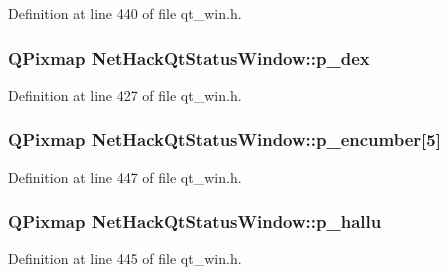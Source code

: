 Definition at line 440 of file qt\+\_\+win.\+h.

\hypertarget{classNetHackQtStatusWindow_a4dbea91b6a1442706721f60296f5d2e2}{
\subsubsection[{p\+\_\+dex}]{\setlength{\rightskip}{0pt plus 5cm}Q\+Pixmap Net\+Hack\+Qt\+Status\+Window\+::p\+\_\+dex\hspace{0.3cm}{\ttfamily [private]}}}\label{classNetHackQtStatusWindow_a4dbea91b6a1442706721f60296f5d2e2}


Definition at line 427 of file qt\+\_\+win.\+h.

\hypertarget{classNetHackQtStatusWindow_a36efb7785759ef09d4b2ecd523148ac3}{
\subsubsection[{p\+\_\+encumber}]{\setlength{\rightskip}{0pt plus 5cm}Q\+Pixmap Net\+Hack\+Qt\+Status\+Window\+::p\+\_\+encumber\mbox{[}5\mbox{]}\hspace{0.3cm}{\ttfamily [private]}}}\label{classNetHackQtStatusWindow_a36efb7785759ef09d4b2ecd523148ac3}


Definition at line 447 of file qt\+\_\+win.\+h.

\hypertarget{classNetHackQtStatusWindow_a44d9b13055d13ea8d9bd8e433c5a1bac}{
\subsubsection[{p\+\_\+hallu}]{\setlength{\rightskip}{0pt plus 5cm}Q\+Pixmap Net\+Hack\+Qt\+Status\+Window\+::p\+\_\+hallu\hspace{0.3cm}{\ttfamily [private]}}}\label{classNetHackQtStatusWindow_a44d9b13055d13ea8d9bd8e433c5a1bac}


Definition at line 445 of file qt\+\_\+win.\+h.

